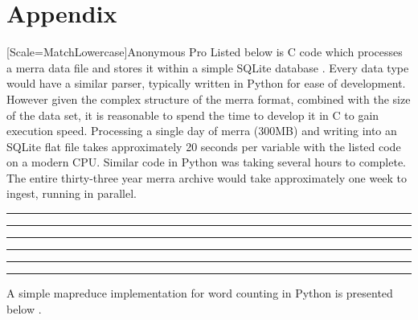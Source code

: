 \section{Appendix}
\newfontfamily{\anonymous}[Scale=MatchLowercase]{Anonymous Pro}
\lstset{ %
    language=C,                             %
    basicstyle=\anonymous,
    tabsize=1,
    breaklines=true,
    breakatwhitespace=false,
    showstringspaces=false,
    showspaces=false,
    showtabs=false
}
Listed below is C code which processes a \gls{merra} data file and stores it within a simple SQLite database \cite{keller1}. Every data type would have a similar parser, typically written in Python for ease of development. However given the complex structure of the \gls{merra} format, combined with the size of the data set, it is reasonable to spend the time to develop it in C to gain execution speed. Processing a single day of \gls{merra} (300MB) and writing into an SQLite flat file takes approximately 20 seconds per variable with the listed code on a modern CPU. Similar code in Python was taking several hours to complete. The entire thirty-three year \gls{merra} archive would take approximately one week to ingest, running in parallel. 
 

\hrule

\hrule

\hrule

\hrule

\hrule

\hrule

\lstset{ %
    language=Python,                             %
    basicstyle=\anonymous,
    tabsize=1,
    breaklines=true,
    breakatwhitespace=false,
    showstringspaces=false,
    showspaces=false,
    showtabs=false
}
A simple mapreduce implementation for word counting in Python is presented below \cite{keller2}.

